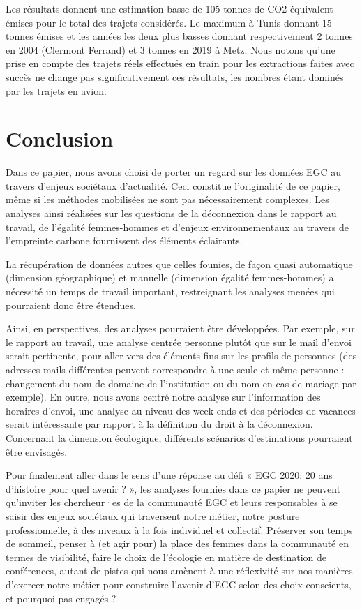 \documentclass[a4paper,french]{rnti}
\begin{document}
Les résultats donnent une estimation basse de 105 tonnes de CO2 équivalent 
émises pour le total des trajets considérés. Le maximum à Tunis donnant 15 
tonnes émises et les années les deux plus basses donnant respectivement 2 
tonnes en 2004 (Clermont Ferrand) et 3 tonnes en 2019 à Metz. Nous notons 
qu'une prise en compte des trajets réels effectués en train pour les 
extractions faites avec succès ne change pas significativement ces 
résultats, les nombres étant dominés par les trajets en avion. 

\section{Conclusion}\label{sec: conclusion}



Dans ce papier, nous avons choisi de porter un regard sur les données EGC 
au travers d'enjeux sociétaux d'actualité. Ceci constitue l'originalité de 
ce papier, même si les méthodes mobilisées ne sont pas nécessairement 
complexes. Les analyses ainsi réalisées sur les questions de la 
déconnexion dans le rapport au travail, de l'égalité femmes-hommes et 
d'enjeux environnementaux au travers de l'empreinte carbone fournissent 
des éléments éclairants.

La récupération de données autres que celles founies, de façon quasi 
automatique (dimension géographique) et manuelle (dimension égalité 
femmes-hommes) a nécessité un temps de travail important, restreignant les 
analyses menées qui pourraient donc être étendues.

Ainsi, en perspectives, des analyses pourraient être développées. Par 
exemple, sur le rapport au travail, une analyse centrée personne plutôt 
que sur le mail d'envoi serait pertinente, pour aller vers des éléments 
fins sur les profils de personnes (des adresses mails différentes peuvent 
correspondre à une seule et même personne : changement du nom de domaine 
de l'institution ou du nom en cas de mariage par exemple). En outre, nous 
avons centré notre analyse sur l'information des horaires d'envoi, une 
analyse au niveau des week-ends et des périodes de vacances serait 
intéressante par rapport à la définition du droit à la déconnexion. 
Concernant la dimension écologique, différents scénarios d'estimations 
pourraient être envisagés.



Pour finalement aller dans le sens d'une réponse au défi « EGC 2020: 20 
ans d’histoire pour quel avenir ? », les analyses fournies dans ce papier 
ne peuvent qu'inviter les chercheur·es de la communauté EGC et leurs 
responsables à se saisir des enjeux sociétaux qui traversent notre métier, 
notre posture professionnelle, à des niveaux à la fois individuel et 
collectif. Préserver son temps de sommeil, penser à (et agir pour) la 
place des femmes dans la communauté en termes de visibilité, faire le 
choix de l'écologie en matière de destination de conférences, autant de 
pistes qui nous amènent à une réflexivité sur nos manières d'exercer notre 
métier pour construire l'avenir d'EGC selon des choix conscients, et 
pourquoi pas engagés ?








\Fr
\end{document}
